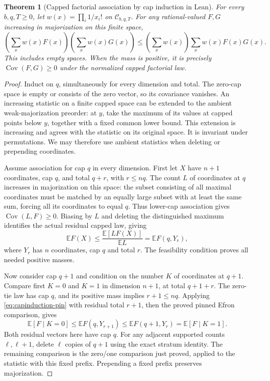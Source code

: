 \documentclass[11pt]{article}
\newtheorem{theorem}{Theorem}
\begin{document}
\begin{theorem}[Capped factorial association by cap induction in Lean]\label{thm:leancapassociation}
For every $b,q,T\geq0$, let $w(x)=\prod_i1/x_i!$ on
$\mathcal C_{b,q,T}$. For any rational-valued $F,G$ increasing in
majorization on this finite space,
\[
 \left(\sum_xw(x)F(x)\right)\left(\sum_xw(x)G(x)\right)
 \leq\left(\sum_xw(x)\right)\sum_xw(x)F(x)G(x).
\]
This includes empty spaces. When the mass is positive, it is precisely
$\operatorname{Cov}(F,G)\geq0$ under the normalized capped factorial law.
\end{theorem}
\begin{proof}
Induct on $q$, simultaneously for every dimension and total. The zero-cap
space is empty or consists of the zero vector, so its covariance vanishes.
An increasing statistic on a finite capped space can be extended to the
ambient weak-majorization preorder: at $y$, take the maximum of its
values at capped points below $y$, together with a fixed common lower
bound. This extension is increasing and agrees with the statistic on
its original space. It is invariant under permutations. We may therefore
use ambient statistics when deleting or prepending coordinates.

Assume association for cap $q$ in every dimension. First let $X$ have
$n+1$ coordinates, cap $q$, and total $q+r$, with $r\leq nq$.
The count $L$ of coordinates at $q$ increases in majorization on this
space: the subset consisting of all maximal coordinates must be matched
by an equally large subset with at least the same sum, forcing all its
coordinates to equal $q$. Thus lower-cap association gives
$\operatorname{Cov}(L,F)\geq0$. Biasing by $L$ and deleting the distinguished
maximum identifies the actual residual capped law, giving
\begin{equation}\label{eq:capinduction-pin}
 \mathbb E F(X)\leq
 \frac{\mathbb E[L F(X)]}{\mathbb E L}
 =\mathbb E F(q,Y_r),
\end{equation}
where $Y_r$ has $n$ coordinates, cap $q$ and total $r$.
The feasibility condition proves all needed positive masses.

Now consider cap $q+1$ and condition on the number $K$ of coordinates
at $q+1$. Compare first $K=0$ and $K=1$ in dimension $n+1$, at total
$q+1+r$. The zero-tie law has cap $q$, and its positive mass implies
$r+1\leq nq$. Applying \eqref{eq:capinduction-pin} with residual total
$r+1$, then the proved pinned Efron comparison, gives
\[
 \mathbb E[F\mid K=0]
 \leq\mathbb E F(q,Y_{r+1})
 \leq\mathbb E F(q+1,Y_r)
 =\mathbb E[F\mid K=1].
\]
Both residual vectors here have cap $q$. For any adjacent supported
counts $\ell,\ell+1$, delete $\ell$ copies of $q+1$ using the exact
stratum identity. The remaining comparison is the zero/one comparison
just proved, applied to the statistic with this fixed prefix. Prepending
a fixed prefix preserves majorization.


\end{proof}
\end{document}
